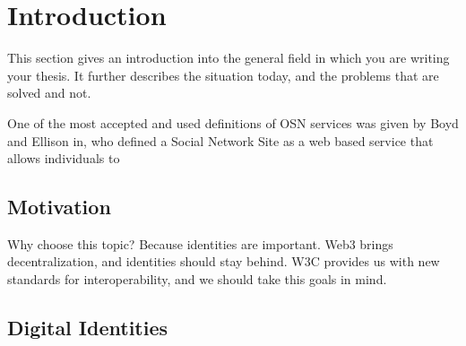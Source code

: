 \chapter{Introduction}
\label{cha:introduction}

This section gives an introduction into the general field in which you are writing your thesis. It further describes the situation today, and the problems that are solved and not.
 
One of the most accepted and used definitions of OSN services was given by Boyd and Ellison in, who defined a Social Network Site  as a web based service that allows individuals to

\section{Motivation}
Why choose this topic? Because identities are important.
Web3 brings decentralization, and identities should stay behind. W3C provides us with new standards for interoperability, and we should take this goals in mind. \cite{FakePaper11}

 
\section{Digital Identities}
 
 
 
 
 
